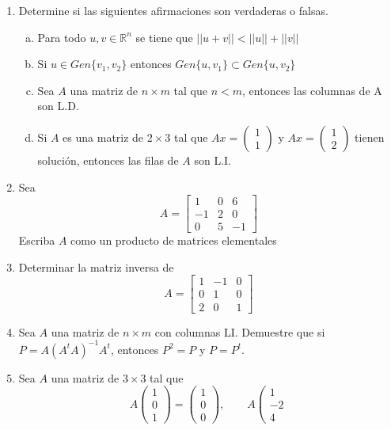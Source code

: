 \documentclass[12pt]{article}
\newenvironment{preguntas}
{\begin{enumerate}\itemsep12pt
	}
	{
	\end{enumerate}
}
\newcommand{\R}{\mathbb{R}}
\begin{document}
\begin{preguntas}
Demuestre que la imagen del plano $\mathbb{P}$ bajo la transformación $T$ es una recta en $\R^4$.
\item Determine si las siguientes afirmaciones son verdaderas o falsas.
\begin{enumerate}[a)]
\item Para todo $u, v \in \R^n$ se tiene que $||u+v|| < ||u||+||v||$
\item Si $u \in Gen\{v_1, v_2\}$ entonces $Gen\{u, v_1\} \subset Gen\{u, v_2\}$
\item Sea $A$ una matriz de $n \times m$ tal que $n < m $, entonces las columnas de A son L.D.
\item Si $A$ es una matriz de $2 \times 3$ tal que $Ax = \begin{pmatrix}
		1\\
		1
		\end{pmatrix}$ y $ Ax = \begin{pmatrix}
		1\\
		2
		\end{pmatrix}$ tienen solución, entonces las filas de $A$ son L.I.
\end{enumerate}
\item Sea
	$$A = \begin{bmatrix}
	1 & 0 & 6\\
	-1 & 2 & 0\\
	0 & 5 & -1
	\end{bmatrix}$$
	Escriba $A$ como un producto de matrices elementales
\item Determinar la matriz inversa de
$$A = \begin{bmatrix}
1 & -1 & 0 \\
0 & 1 & 0 \\
2 & 0 & 1
\end{bmatrix}$$
\item Sea $A$ una matriz de $n\times m$ con columnas LI. Demuestre que si $P=A(A^tA)^{-1}A^{t}$, entonces $P^2=P$ y $P=P^t$.
\item Sea $A$ una matriz de $3\times 3$ tal que
      $$A\left(\begin{array}{r}
  1\\0\\1
\end{array}\right)= \left(\begin{array}{r}
  1\\0\\0
\end{array}\right),\quad\quad A \left(\begin{array}{r}
  1\\-2\\4

\end{array}$$
\end{preguntas}
\end{document}
